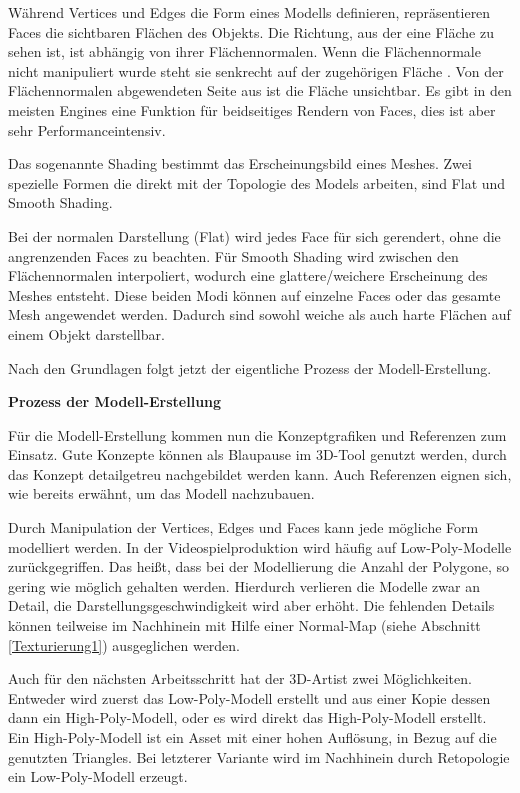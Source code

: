 \par
Während Vertices und Edges die Form eines Modells definieren, repräsentieren Faces die sichtbaren Flächen des Objekts. Die Richtung, aus der eine Fläche zu sehen ist, ist abhängig von ihrer Flächennormalen. Wenn die Flächennormale nicht manipuliert wurde steht sie senkrecht auf der zugehörigen Fläche \parencite[S.88]{blender}.
\enlargethispage{10.5pt}
\newpage
Von der Flächennormalen abgewendeten Seite aus ist die Fläche unsichtbar. Es gibt in den meisten Engines eine Funktion für beidseitiges Rendern von Faces, dies ist aber sehr Performanceintensiv.
\par
Das sogenannte Shading bestimmt das Erscheinungsbild eines Meshes. Zwei spezielle Formen die direkt mit der Topologie des Models arbeiten, sind Flat und Smooth Shading.
\par
Bei der normalen Darstellung (Flat) wird jedes Face für sich gerendert, ohne die angrenzenden Faces zu beachten. Für Smooth Shading wird zwischen den Flächennormalen interpoliert, wodurch eine glattere/weichere Erscheinung des Meshes entsteht. Diese beiden Modi können auf einzelne Faces oder das gesamte Mesh angewendet werden. Dadurch sind sowohl weiche als auch harte Flächen auf einem Objekt darstellbar. \parencite[S.\,388-394]{blender}
\par
Nach den Grundlagen folgt jetzt der eigentliche Prozess der Modell-Erstellung.
\par
\textbf{Prozess der Modell-Erstellung}
\par
Für die Modell-Erstellung kommen nun die Konzeptgrafiken und Referenzen zum Einsatz. Gute Konzepte können als Blaupause im 3D-Tool genutzt werden, durch das Konzept detailgetreu nachgebildet werden kann. Auch Referenzen eignen sich, wie bereits erwähnt, um das Modell nachzubauen.
\par
Durch Manipulation der Vertices, Edges und Faces kann jede mögliche Form modelliert werden. In der Videospielproduktion wird häufig auf Low-Poly-Modelle zurückgegriffen. Das heißt, dass bei der Modellierung die Anzahl der Polygone, so gering wie möglich gehalten werden. Hierdurch verlieren die Modelle zwar an Detail, die Darstellungsgeschwindigkeit wird aber erhöht. Die fehlenden Details können teilweise im Nachhinein mit Hilfe einer Normal-Map (siehe Abschnitt \ref{Texturierung1}) ausgeglichen werden.
\par
Auch für den nächsten Arbeitsschritt hat der 3D-Artist zwei Möglichkeiten. Entweder wird zuerst das Low-Poly-Modell erstellt und aus einer Kopie dessen dann ein High-Poly-Modell, oder es wird direkt das High-Poly-Modell erstellt. Ein High-Poly-Modell ist ein Asset mit einer hohen Auflösung, in Bezug auf die genutzten Triangles. Bei letzterer Variante wird im Nachhinein durch Retopologie ein Low-Poly-Modell erzeugt.
